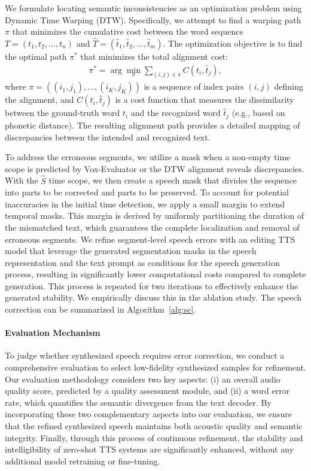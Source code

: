 \documentclass[letterpaper]{article} %
\begin{document}
We formulate locating semantic inconsistencies as an optimization problem using Dynamic Time Warping (DTW). Specifically, we attempt to find a warping path $\pi$ that minimizes the cumulative cost between the word sequence $T=(t_1,t_2,\dots,t_n)$ and $\hat{T}=(\hat{t}_1,\hat{t}_2,\dots,\hat{t}_m)$. The optimization objective is to find the optimal path $\pi^{\ast}$ that minimizes the total alignment cost:
\begin{align}
\pi^{\ast}
= \arg\min_{\pi}
\sum_{(i,j)\in\pi} C\!\left(t_i,\hat{t}_j\right),
\end{align}
where $\pi=((i_1,j_1),\dots,(i_K,j_K))$ is a sequence of index pairs $(i,j)$ defining the alignment, and $C\!\left(t_i,\hat{t}_j\right)$ is a cost function that measures the dissimilarity between the ground-truth word $t_i$ and the recognized word $\hat{t}_j$ (e.g., based on phonetic distance). The resulting alignment path provides a detailed mapping of discrepancies between the intended and recognized text. 

To address the erroneous segments, we utilize a mask when a non-empty time scope is predicted by Vox-Evaluator or the DTW alignment reveals discrepancies. With the $\hat{S}$ time scope, we then create a speech mask that divides the sequence into parts to be corrected and parts to be preserved. To account for potential inaccuracies in the initial time detection, we apply a small margin to extend temporal masks. This margin is derived by uniformly partitioning the duration of the mismatched text, which guarantees the complete localization and removal of erroneous segments.
We refine segment-level speech errors with an editing TTS model that leverage the generated segmentation masks in the speech representation and the text prompt as conditions for the speech generation process, resulting in significantly lower computational costs compared to complete generation.
This process is repeated for two iterations to effectively enhance the generated stability. We empirically discuss this in the ablation study. The speech correction can be summarized in Algorithm~\ref{alg:sc}. 

\paragraph{Evaluation Mechanism}
To judge whether synthesized speech requires error correction, we conduct a comprehensive evaluation to select low-fidelity synthesized samples for refinement. Our evaluation methodology considers two key aspects: (i) an overall audio quality score, predicted by a quality assessment module, and (ii) a word error rate, which quantifies the semantic divergence from the text decoder. By incorporating these two complementary aspects into our evaluation, we ensure that the refined synthesized speech maintains both acoustic quality and semantic integrity. Finally, through this process of continuous refinement, the stability and intelligibility of zero-shot TTS systems are significantly enhanced, without any additional model retraining or fine-tuning.
\end{document}
